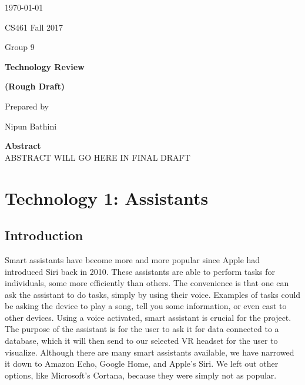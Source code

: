 \documentclass[onecolumn, draftclsnofoot,10pt, compsoc]{IEEEtran}
\newcommand{\NameSigPair}[1]{\par
\makebox[2.75in][r]{#1} \hfil 	\makebox[3.25in]{\makebox[2.25in]{\hrulefill} \hfill		\makebox[.75in]{\hrulefill}}
\par\vspace{-12pt} \textit{\tiny\noindent
\makebox[2.75in]{} \hfil		\makebox[3.25in]{\makebox[2.25in][r]{Signature} \hfill	\makebox[.75in][r]{Date}}}}
\renewcommand{\NameSigPair}[1]{#1}
\begin{document}
\begin{titlepage}
    \begin{singlespace}
        \hfill 
        \par\vspace{.2in}
        \centering
        \scshape{
            {\large\today}\par
			{\large CS461 Fall 2017}\par
			{\large Group 9}\par
            \vspace{2.5in}
            \textbf{\Huge{Technology Review}}\par
			\textbf{\Huge{(Rough Draft)}}\par
            \vspace{2.5in}
            {\large Prepared by }\par
            \vspace{5pt}
            {\Large
                \NameSigPair{Nipun Bathini}\par
			\vfill
			\textbf{Abstract} \\
            \indent 
				ABSTRACT WILL GO HERE IN FINAL DRAFT
            }
            \vspace{20pt}
        }
      
    \end{singlespace}
\end{titlepage}
\newpage
{}



\section{Technology 1: Assistants}
	\subsection{Introduction}
	
		Smart assistants have become more and more popular since Apple had introduced Siri back in 2010. These assistants are able to perform tasks for individuals, some more efficiently than others. 
		The convenience is that one can ask the assistant to do tasks, simply by using their voice. Examples of tasks could be asking the device to play a song, tell you some information, or even cast 
		to other devices. Using a voice activated, smart assistant is crucial for the project. The purpose of the assistant is for the user to ask it for data connected to a database, which it will then 
		send to our selected VR headset for the user to visualize.  Although there are many smart assistants available, we have narrowed it down to Amazon Echo, Google Home, and Apple’s Siri. We left out 
		other options, like Microsoft’s Cortana, because they were simply not as popular. 
	
\end{document}
